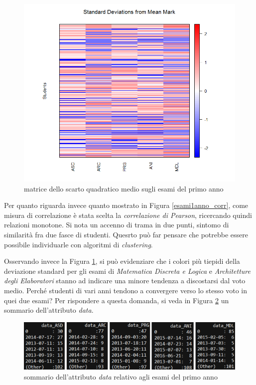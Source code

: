                 \begin{figure}
                    \centering
                    \caption{matrice dello scarto quadratico medio sugli esami del primo anno}
                    \label{esami1anno_stddev}
                	\includegraphics[scale=0.5]{img/std_dev_matrix_1.png}
                \end{figure}

                Per quanto riguarda invece quanto mostrato in Figura \ref{esami1anno_corr}, come misura di correlazione è stata scelta la \textit{correlazione di Pearson}, ricercando quindi relazioni monotone. Si nota un accenno di trama in due punti, sintomo di similarità fra due fasce di studenti. Quesrto può far pensare che potrebbe essere possibile individuarle con algoritmi di \textit{clustering}.

                Osservando invece la Figura \ref{esami1anno_stddev}, si può evidenziare che i colori più tiepidi della deviazione standard per gli esami di \textit{Matematica Discreta e Logica} e \textit{Architetture degli Elaboratori} stanno ad indicare una minore tendenza a discostarsi dal voto medio. Perché studenti di vari anni tendono a convergere verso lo stesso voto in quei due esami? Per rispondere a questa domanda, si veda in Figura \ref{1annosommario} un sommario dell'attributo \textit{data}.

                \begin{figure}
                    \centering
                    \caption{sommario dell'attributo \textit{data} relativo agli esami del primo anno}
                    \label{1annosommario}
                	\includegraphics[scale=0.8]{img/sommario_1_anno.png}
                \end{figure}

